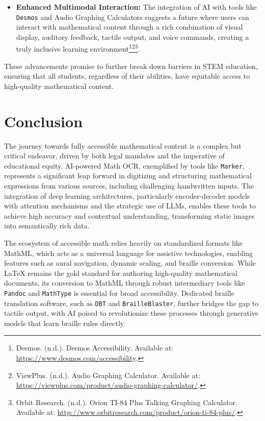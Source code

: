 \begin{itemize}
    \item \textbf{Enhanced Multimodal Interaction:} The integration of AI with tools like \texttt{Desmos} and Audio Graphing Calculators suggests a future where users can interact with mathematical content through a rich combination of visual display, auditory feedback, tactile output, and voice commands, creating a truly inclusive learning environment\footnote{Desmos. (n.d.). Desmos Accessibility. Available at: \url{https://www.desmos.com/accessibility}.}\footnote{ViewPlus. (n.d.). Audio Graphing Calculator. Available at: \url{https://viewplus.com/product/audio-graphing-calculator/}.}\footnote{Orbit Research. (n.d.). Orion TI-84 Plus Talking Graphing Calculator. Available at: \url{http://www.orbitresearch.com/product/orion-ti-84-plus/}.}.
\end{itemize}
These advancements promise to further break down barriers in STEM education, ensuring that all students, regardless of their abilities, have equitable access to high-quality mathematical content.

\section{Conclusion}
The journey towards fully accessible mathematical content is a complex but critical endeavor, driven by both legal mandates and the imperative of educational equity. AI-powered Math OCR, exemplified by tools like \texttt{Marker}, represents a significant leap forward in digitizing and structuring mathematical expressions from various sources, including challenging handwritten inputs. The integration of deep learning architectures, particularly encoder-decoder models with attention mechanisms and the strategic use of LLMs, enables these tools to achieve high accuracy and contextual understanding, transforming static images into semantically rich data.

The ecosystem of accessible math relies heavily on standardized formats like MathML, which acts as a universal language for assistive technologies, enabling features such as aural navigation, dynamic scaling, and braille conversion. While LaTeX remains the gold standard for authoring high-quality mathematical documents, its conversion to MathML through robust intermediary tools like \texttt{Pandoc} and \texttt{MathType} is essential for broad accessibility. Dedicated braille translation software, such as \texttt{DBT} and \texttt{BrailleBlaster}, further bridges the gap to tactile output, with AI poised to revolutionize these processes through generative models that learn braille rules directly.


